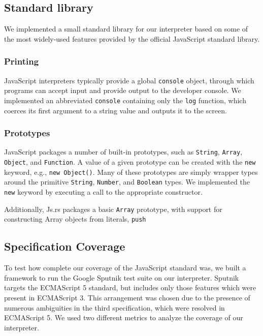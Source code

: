 \documentclass{article}
\begin{document}
\begin{multicols}{2}
\subsection*{Standard library}

We implemented a small standard library for our interpreter based on some of the
most widely-used features provided by the official JavaScript standard library.

\subsubsection*{Printing}

JavaScript interpreters typically provide a global \texttt{console} object,
through which programs can accept input and provide output to the developer
console. We implemented an abbreviated \texttt{console} containing only the
\texttt{log} function, which coerces its first argument to a string value and
outputs it to the screen.

\subsubsection*{Prototypes}

JavaScript packages a number of built-in prototypes, such as \texttt{String},
\texttt{Array}, \texttt{Object}, and \texttt{Function}. A value of a given
prototype can be created with the \texttt{new} keyword, e.g., \texttt{new
Object()}. Many of these prototypes are simply wrapper types around the
primitive \texttt{String}, \texttt{Number}, and \texttt{Boolean} types. We
implemented the \texttt{new} keyword by executing a call to the appropriate
constructor. \newline

Additionally, Js.rs packages a basic \texttt{Array} prototype, with support for
constructing Array objects from literals, \texttt{push}

\subsection{Specification Coverage}

To test how complete our coverage of the JavaScript standard was, we built a
framework to run the Google Sputnik test suite\cite{sputnik} on our interpreter.
Sputnik targets the ECMAScript 5 standard, but includes only those features
which were present in ECMAScript 3. This arrangement was chosen due to the
presence of numerous ambiguities in the third specification, which were resolved
in ECMAScript 5. We used two different metrics to analyze the coverage of our
interpreter.


\end{multicols}
\end{document}
